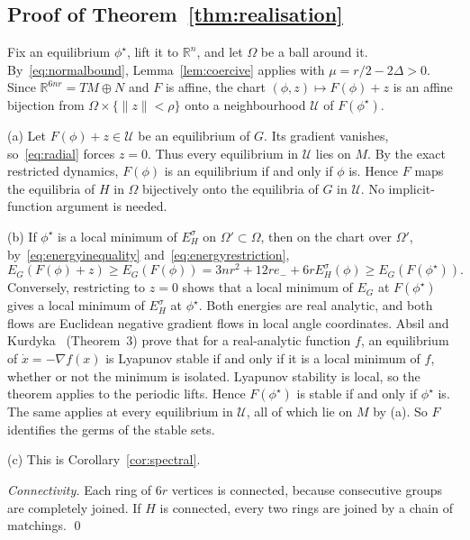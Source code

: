 \documentclass[11pt,a4paper]{article}
\theoremstyle{definition}\newtheorem{conjecture}{Conjecture}
\theoremstyle{remark}\newtheorem{remark}[theorem]{Remark}
\newcommand{\R}{\mathbb R}
\begin{document}
\subsection{Proof of Theorem~\ref{thm:realisation}}
Fix an equilibrium $\phi^\star$, lift it to $\R^n$, and let $\Omega$ be a ball around it. By~\eqref{eq:normalbound}, Lemma~\ref{lem:coercive} applies with $\mu=r/2-2\Delta>0$. Since $\R^{6nr}=TM\oplus N$ and $F$ is affine, the chart $(\phi,z)\mapsto F(\phi)+z$ is an affine bijection from $\Omega\times\{\|z\|<\rho\}$ onto a neighbourhood $\mathcal U$ of $F(\phi^\star)$.

(a) Let $F(\phi)+z\in\mathcal U$ be an equilibrium of $G$. Its gradient vanishes, so~\eqref{eq:radial} forces $z=0$. Thus every equilibrium in $\mathcal U$ lies on $M$. By the exact restricted dynamics, $F(\phi)$ is an equilibrium if and only if $\phi$ is. Hence $F$ maps the equilibria of $H$ in $\Omega$ bijectively onto the equilibria of $G$ in $\mathcal U$. No implicit-function argument is needed.

(b) If $\phi^\star$ is a local minimum of $E_H^\sigma$ on $\Omega'\subset\Omega$, then on the chart over $\Omega'$, by~\eqref{eq:energyinequality} and~\eqref{eq:energyrestriction},
\[
 E_G(F(\phi)+z)\ge E_G(F(\phi))=3nr^2+12re_-+6rE_H^\sigma(\phi)\ge E_G(F(\phi^\star)).
\]
Conversely, restricting to $z=0$ shows that a local minimum of $E_G$ at $F(\phi^\star)$ gives a local minimum of $E_H^\sigma$ at $\phi^\star$. Both energies are real analytic, and both flows are Euclidean negative gradient flows in local angle coordinates. Absil and Kurdyka~\cite{absil} (Theorem~3) prove that for a real-analytic function $f$, an equilibrium of $\dot x=-\nabla f(x)$ is Lyapunov stable if and only if it is a local minimum of $f$, whether or not the minimum is isolated. Lyapunov stability is local, so the theorem applies to the periodic lifts. Hence $F(\phi^\star)$ is stable if and only if $\phi^\star$ is. The same applies at every equilibrium in $\mathcal U$, all of which lie on $M$ by (a). So $F$ identifies the germs of the stable sets.

(c) This is Corollary~\ref{cor:spectral}.

\emph{Connectivity.} Each ring of $6r$ vertices is connected, because consecutive groups are completely joined. If $H$ is connected, every two rings are joined by a chain of matchings. \qed
\end{document}
